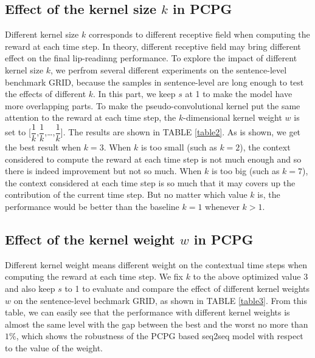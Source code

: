 \documentclass[a4paper, 10pt, conference]{ieeeconf}      %
\begin{document}
\subsection{Effect of the kernel size $k$ in PCPG} \label{section4.2}
Different kernel size $k$ corresponds to different receptive field when computing the reward at each time step. In theory, different receptive field may bring different effect on the final lip-readinng performance. To explore the impact of different kernel size $k$, we perfrom several different experiments on the sentence-level benchmark GRID, because the samples in sentence-level are long enough to test the effects of different $k$. In this part, we keep $s$ at 1 to make the model have more overlapping parts. To make the pseudo-convolutional kernel put the same attention to the reward at each time step, the $k$-dimensional kernel weight $w$ is set to [$\dfrac{1}{k}$,$\dfrac{1}{k}$,\dots,$\dfrac{1}{k}$]. The results are shown in TABLE \ref{table2}. As is shown, we get the best result when $k=3$. When $k$ is too small (such as $k=2$), the context considered to compute the reward at each time step is not much enough and so there is indeed improvement but not so much. When $k$ is too big (such as $k=7$), the context considered at each time step is so much that it may covers up the contribution of the current time step. But no matter which value $k$ is, the performance would be better than the baseline $k=1$ whenever $k>1$. 


\subsection{Effect of the kernel weight $w$ in PCPG}
Different kernel weight means different weight on the contextual time steps when computing the reward at each time step. We fix $k$ to the above optimized value 3 and also keep $s$ to 1 to evaluate and compare the effect of different kernel weights $w$ on the sentence-level bechmark GRID, as shown in TABLE \ref{table3}. From this table, we can easily see that the performance with different kernel weights is almost the same level with the gap between the best and the worst no more than $1\%$, which shows the robustness of the PCPG based seq2seq model with respect to the value of the weight.
\end{document}
